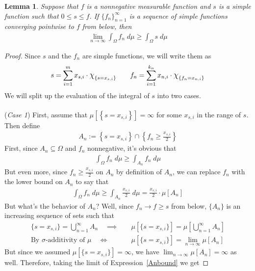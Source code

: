 \documentclass[12pt]{article}
\theoremstyle{plain}
\newtheorem{lem}[thm]{Lemma}
\theoremstyle{definition}
\theoremstyle{remark}
\newcommand*{\Chi}{\mbox{\large$\chi$}} %
\newcommand{\limn}{\lim_{n\rightarrow\infty}}
\newcommand{\ra}{\rightarrow}
\newcommand{\sumim}{\sum^m_{i=1}}
\newcommand{\ninf}{_{n=1}^\infty}
\begin{document}
\begin{lem}
Suppose that $f$ is a nonnegative measurable function and $s$ is a
simple function such that $0\leq s\leq f$. If $\{f_n\}\ninf$ is a
sequence of simple functions converging pointwise to $f$ from below,
then
\begin{align*}
  \limn \int_\Omega f_n\;d\mu \geq \int_\Omega s \; d\mu
\end{align*}
\end{lem}
\begin{proof}
Since $s$ and the $f_n$ are simple functions, we will write them as
\begin{align*}
  s = \sumim x_{s,i} \cdot \Chi_{\left\{ s=x_{s,i}\right\}}
  \qquad
  f_n = \sum_{i=1}^{k_n} x_{n,i} \cdot
  \Chi_{\left\{ f_n = x_{n,i} \right\}}
\end{align*}
We will split up the evaluation of the integral of $s$ into two cases.
\\
\\
(\emph{Case 1})
First, assume that
$\mu[\left\{ s=x_{s,i}\right\}]=\infty$
for some $x_{s,i}$ in the range of $s$. Then define
\begin{align*}
  A_n := \left\{ s=x_{s,i} \right\}
  \cap \left\{ f_n\geq \frac{x_{s,i}}{2} \right\}
\end{align*}
First, since $A_n\subseteq \Omega$ and $f_n$ nonnegative, it's obvious
that
\begin{align*}
  \int_\Omega f_n \; d\mu
  \geq
  \int_{A_n} f_n \; d\mu
\end{align*}
But even more, since $f_n \geq \frac{x_{s,i}}{2}$ on $A_n$ by definition
of $A_n$, we can replace $f_n$ with the lower bound on $A_n$ to say that
\begin{align}
  \int_\Omega f_n \; d\mu
  \geq
  \int_{A_n} \frac{x_{s,i}}{2} \; d\mu
  =\frac{x_{s,i}}{2} \cdot \mu[A_n]
  \label{Anbound}
\end{align}
But what's the behavior of $A_n$? Well, since $f_n\ra f\geq s$ from
below, $\{A_n\}$ is an increasing sequence of sets such that
\begin{align*}
  \{s=x_{s,i}\} = \bigcup\ninf A_n
  \quad\implies&\quad
  \mu[\{s=x_{s,i}\}] = \mu\left[\bigcup\ninf A_n\right] \\
  \text{By $\sigma$-additivity of $\mu$}
  \quad \iff&\quad
  \mu[\{s=x_{s,i}\}] = \limn \mu\left[A_n\right]
\end{align*}
But since we assumed $\mu[\{s=x_{s,i}\}]=\infty$, we
have $\limn \mu[A_n]=\infty$ as well. Therefore, taking the limit of
Expression~\ref{Anbound} we get

\end{proof}
\end{document}
